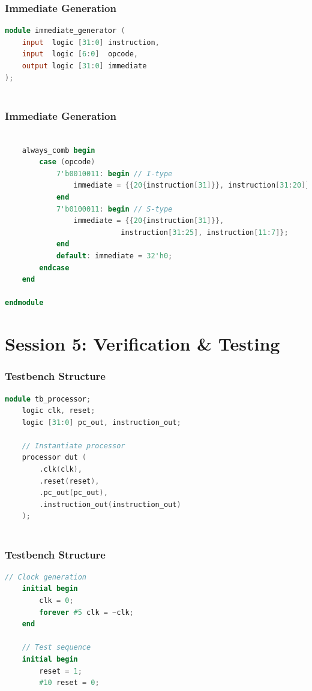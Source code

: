 \documentclass[aspectratio=169,xcolor=dvipsnames]{beamer}
\begin{document}
\begin{frame}[fragile]
\frametitle{Immediate Generation}
\begin{lstlisting}[language=Verilog]
module immediate_generator (
    input  logic [31:0] instruction,
    input  logic [6:0]  opcode,
    output logic [31:0] immediate
);
    
\end{lstlisting}
\end{frame}


\begin{frame}[fragile]
\frametitle{Immediate Generation}
\begin{lstlisting}[language=Verilog]
    
    always_comb begin
        case (opcode)
            7'b0010011: begin // I-type
                immediate = {{20{instruction[31]}}, instruction[31:20]};
            end
            7'b0100011: begin // S-type
                immediate = {{20{instruction[31]}}, 
                           instruction[31:25], instruction[11:7]};
            end
            default: immediate = 32'h0;
        endcase
    end
    
endmodule
\end{lstlisting}
\end{frame}



\section{Session 5: Verification \& Testing}

\begin{frame}[fragile]
\frametitle{Testbench Structure}
\begin{lstlisting}[language=Verilog]
module tb_processor;
    logic clk, reset;
    logic [31:0] pc_out, instruction_out;
    
    // Instantiate processor
    processor dut (
        .clk(clk),
        .reset(reset),
        .pc_out(pc_out),
        .instruction_out(instruction_out)
    );
    
\end{lstlisting}
\end{frame}

\begin{frame}[fragile]
\frametitle{Testbench Structure}
\begin{lstlisting}[language=Verilog]
    // Clock generation
    initial begin
        clk = 0;
        forever #5 clk = ~clk;
    end
    
    // Test sequence
    initial begin
        reset = 1;
        #10 reset = 0;
        
\end{lstlisting}
\end{frame}
\end{document}
